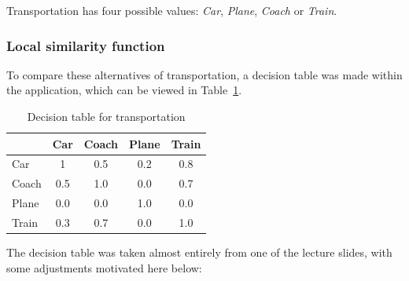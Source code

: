 \documentclass[12pt]{article}
\begin{document}
Transportation has four possible values: \textit{Car}, \textit{Plane}, \textit{Coach} or \textit{Train}. 

\subsubsection{Local similarity function}
\label{sec:transport-sim}

To compare these alternatives of transportation, a decision table was made within the application, which can be viewed in Table~\ref{tab:transport}. 

\begin{table}[h]
\centering
\begin{tabular}{l|cccc}
  & Car & Coach & Plane & Train\\\hline
Car & 1 & 0.5 & 0.2 & 0.8 \\
Coach & 0.5 & 1.0 & 0.0 & 0.7 \\
Plane & 0.0 & 0.0 & 1.0 & 0.0 \\
Train & 0.3 & 0.7 & 0.0 & 1.0
\end{tabular}
\caption{\label{tab:transport}Decision table for transportation}
\end{table}

The decision table was taken almost entirely from one of the lecture slides, with some adjustments motivated here below:
\end{document}
